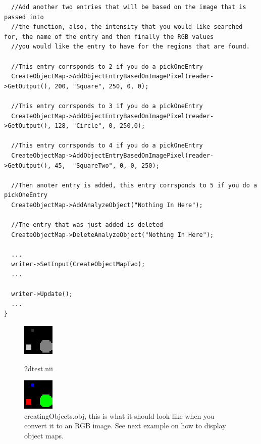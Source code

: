 \documentclass{InsightArticle}
\begin{document}
\begin{itemize}
\begin{verbatim}
  //Add another two entries that will be based on the image that is passed into 
  //the function, also, the intensity that you would like searched for, the name of the entry and then finally the RGB values
  //you would like the entry to have for the regions that are found.

  //This entry corrsponds to 2 if you do a pickOneEntry
  CreateObjectMap->AddObjectEntryBasedOnImagePixel(reader->GetOutput(), 200, "Square", 250, 0, 0);

  //This entry corrsponds to 3 if you do a pickOneEntry
  CreateObjectMap->AddObjectEntryBasedOnImagePixel(reader->GetOutput(), 128, "Circle", 0, 250,0);

  //This entry corrsponds to 4 if you do a pickOneEntry
  CreateObjectMap->AddObjectEntryBasedOnImagePixel(reader->GetOutput(), 45,  "SquareTwo", 0, 0, 250);

  //Then anoter entry is added, this entry corrsponds to 5 if you do a pickOneEntry
  CreateObjectMap->AddAnalyzeObject("Nothing In Here");

  //The entry that was just added is deleted
  CreateObjectMap->DeleteAnalyzeObject("Nothing In Here");
  
  ...
  writer->SetInput(CreateObjectMapTwo);
  ...
  
  writer->Update();
  ...
}
\end{verbatim} \normalsize
  

\begin{figure}[h]
  \hfill
  \begin{minipage}[t]{.45\textwidth}
    \begin{center}  
      \includegraphics[width=.28\textwidth]{2dtest.eps}
      \caption{2dtest.nii}
      \label{fig-tc}
    \end{center}
  \end{minipage}
  \hfill
  \begin{minipage}[t]{.45\textwidth}
    \begin{center}  
      \includegraphics[width=.28\textwidth]{creatingObject.eps}
      \caption{creatingObjects.obj, this is what it should look like when you convert it to an RGB image.  See next example on how to display 
    object maps.}
      \label{fig-tc}
    \end{center}
  \end{minipage}
  \hfill
\end{figure}  


\end{itemize}
\end{document}
